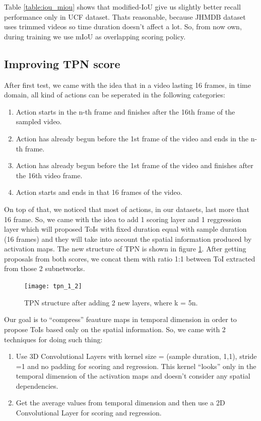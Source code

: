 Table \ref{table:iou_miou} shows that modified-IoU give us slightly better recall performance only in UCF dataset. Thats reasonable, because JHMDB dataset
uses trimmed videos so time duration doesn't affect a lot. So, from now own, during training we use mIoU as overlapping scoring policy.

\subsection{Improving TPN score}
After first test, we came with the idea that in a video lasting 16 frames, in time domain, all kind of actions can be seperated in the following categories:
\begin{enumerate}
\item Action starts in the n-th  frame and finishes after the 16th frame of the sampled video.
\item Action has already begun before the 1st frame of the video and ends in the n-th frame.
\item Action has already begun before the 1st frame of the video and finishes after the 16th video frame.
\item Action starts and ends in that 16 frames of the video.
\end{enumerate}

On top of that, we noticed that most of actions, in our datasets, last more that 16 frame. So, we came with the idea to add  1 scoring layer and 1 reggression layer
which will proposed ToIs with fixed duration equal with sample duration (16 frames) and they will take into account the spatial information produced by activation maps.
The new structure of TPN is shown in figure \ref{fig:tpn_1_2}. After getting proposals from both scores, we concat them with ratio 1:1 between ToI extracted
from those 2 subnetworks.

\begin{figure}[h]
  \centering
  \texttt{[image: tpn\_1\_2]}
  \caption{TPN structure after adding 2 new layers, where k = 5n.}
  \label{fig:tpn_1_2}
\end{figure}
Our goal is to ``compress'' feauture maps in temporal dimension in order to propose ToIs based only on the spatial information.
So, we came with 2 techniques for doing such thing:
\begin{enumerate}
\item Use 3D Convolutional Layers with kernel size = (sample duration, 1,1), stride =1 and no padding for scoring and regression.
  This kernel ``looks'' only in the temporal dimension of the activation maps and doesn't consider any spatial dependencies.
\item Get the average values from temporal dimension and then use a 2D Convolutional Layer for scoring and regression.
\end{enumerate}

